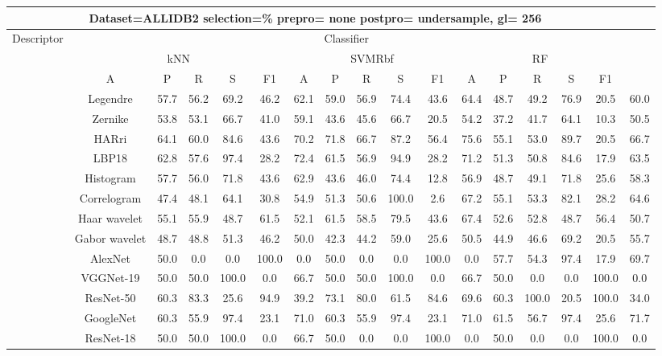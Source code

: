 \documentclass[12pt,italian]{article}
\begin{document}
\begin{tiny}
\begin{longtable}{lcccccccccccccccc}
\toprule
\multicolumn{16}{c}{Dataset=ALLIDB2 selection=\% prepro= none postpro= undersample, gl= 256} \\ 
\toprule
Descriptor & \multicolumn{15}{c}{Classifier} \\ 
& \multicolumn{5}{c}{kNN} & \multicolumn{5}{c}{SVMRbf} & \multicolumn{5}{c}{RF} \\ 
& A & P & R & S & F1 & A & P & R & S & F1 & A & P & R & S & F1 \\ 
\midrule
& Legendre & 57.7 & 56.2 & 69.2 & 46.2 & 62.1 & 59.0 & 56.9 & 74.4 & 43.6 & 64.4 & 48.7 & 49.2 & 76.9 & 20.5 & 60.0 \\ 
& Zernike & 53.8 & 53.1 & 66.7 & 41.0 & 59.1 & 43.6 & 45.6 & 66.7 & 20.5 & 54.2 & 37.2 & 41.7 & 64.1 & 10.3 & 50.5 \\ 
& HARri & 64.1 & 60.0 & 84.6 & 43.6 & 70.2 & 71.8 & 66.7 & 87.2 & 56.4 & 75.6 & 55.1 & 53.0 & 89.7 & 20.5 & 66.7 \\ 
& LBP18 & 62.8 & 57.6 & 97.4 & 28.2 & 72.4 & 61.5 & 56.9 & 94.9 & 28.2 & 71.2 & 51.3 & 50.8 & 84.6 & 17.9 & 63.5 \\ 
& Histogram & 57.7 & 56.0 & 71.8 & 43.6 & 62.9 & 43.6 & 46.0 & 74.4 & 12.8 & 56.9 & 48.7 & 49.1 & 71.8 & 25.6 & 58.3 \\ 
& Correlogram & 47.4 & 48.1 & 64.1 & 30.8 & 54.9 & 51.3 & 50.6 & 100.0 &  2.6 & 67.2 & 55.1 & 53.3 & 82.1 & 28.2 & 64.6 \\ 
& Haar wavelet & 55.1 & 55.9 & 48.7 & 61.5 & 52.1 & 61.5 & 58.5 & 79.5 & 43.6 & 67.4 & 52.6 & 52.8 & 48.7 & 56.4 & 50.7 \\ 
& Gabor wavelet & 48.7 & 48.8 & 51.3 & 46.2 & 50.0 & 42.3 & 44.2 & 59.0 & 25.6 & 50.5 & 44.9 & 46.6 & 69.2 & 20.5 & 55.7 \\ 
& AlexNet & 50.0 &  0.0 &  0.0 & 100.0 &  0.0 & 50.0 &  0.0 &  0.0 & 100.0 &  0.0 & 57.7 & 54.3 & 97.4 & 17.9 & 69.7 \\ 
& VGGNet-19 & 50.0 & 50.0 & 100.0 &  0.0 & 66.7 & 50.0 & 50.0 & 100.0 &  0.0 & 66.7 & 50.0 &  0.0 &  0.0 & 100.0 &  0.0 \\ 
& ResNet-50 & 60.3 & 83.3 & 25.6 & 94.9 & 39.2 & 73.1 & 80.0 & 61.5 & 84.6 & 69.6 & 60.3 & 100.0 & 20.5 & 100.0 & 34.0 \\ 
& GoogleNet & 60.3 & 55.9 & 97.4 & 23.1 & 71.0 & 60.3 & 55.9 & 97.4 & 23.1 & 71.0 & 61.5 & 56.7 & 97.4 & 25.6 & 71.7 \\ 
& ResNet-18 & 50.0 & 50.0 & 100.0 &  0.0 & 66.7 & 50.0 &  0.0 &  0.0 & 100.0 &  0.0 & 50.0 &  0.0 &  0.0 & 100.0 &  0.0 \\ 

\end{longtable}
\end{tiny}
\end{document}
